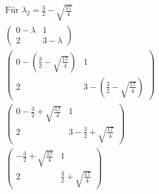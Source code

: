 \begin{align*}
    \text{Für } \lambda_2 = \frac{3}{2} - \sqrt{\frac{17}{4}}                                    \\
    \begin{pmatrix}
        0 - \lambda & 1           \\
        2           & 3 - \lambda
    \end{pmatrix}                                                                    \\
    \begin{pmatrix}
        0 - (\frac{3}{2} - \sqrt{\frac{17}{4}}) & 1                                       \\
        2                                       & 3 - (\frac{3}{2} - \sqrt{\frac{17}{4}})
    \end{pmatrix} \\
    \begin{pmatrix}
        0 -\frac{3}{2} + \sqrt{\frac{17}{4}} & 1                                    \\
        2                                    & 3 -\frac{3}{2} + \sqrt{\frac{17}{4}}
    \end{pmatrix}       \\
    \begin{pmatrix}
        -\frac{3}{2} + \sqrt{\frac{17}{4}} & 1                                 \\
        2                                  & \frac{3}{2} + \sqrt{\frac{17}{4}}
    \end{pmatrix}            \\
\end{align*}

